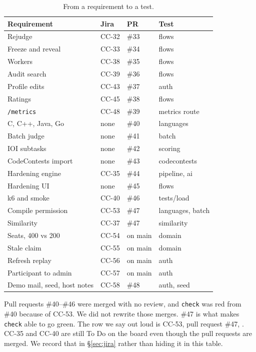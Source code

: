 \documentclass[11pt,a4paper]{article}
\begin{document}
\begin{table}[ht]
\centering
\caption{From a requirement to a test.}
\label{tab:trace}
{\small
\begin{tabularx}{\textwidth}{@{}Y l l Y@{}}
\toprule
Requirement & Jira & PR & Test \\
\midrule
Rejudge & CC-32 & \#33 & flows \\
Freeze and reveal & CC-33 & \#34 & flows \\
Workers & CC-38 & \#35 & flows \\
Audit search & CC-39 & \#36 & flows \\
Profile edits & CC-43 & \#37 & auth \\
Ratings & CC-45 & \#38 & flows \\
\texttt{/metrics} & CC-48 & \#39 & metrics route \\
C, C++, Java, Go & none & \#40 & languages \\
Batch judge & none & \#41 & batch \\
IOI subtasks & none & \#42 & scoring \\
CodeContests import & none & \#43 & codecontests \\
Hardening engine & CC-35 & \#44 & pipeline, ai \\
Hardening UI & none & \#45 & flows \\
k6 and smoke & CC-40 & \#46 & tests/load \\
Compile permission & CC-53 & \#47 & languages, batch \\
Similarity & CC-37 & \#47 & similarity \\
Seats, 400 vs 200 & CC-54 & on main & domain \\
Stale claim & CC-55 & on main & domain \\
Refresh replay & CC-56 & on main & auth \\
Participant to admin & CC-57 & on main & auth \\
Demo mail, seed, host notes & CC-58 & \#48 & auth, seed \\
\bottomrule
\end{tabularx}
}
\end{table}

Pull requests \#40--\#46 were merged with no review, and \texttt{check} was red from \#40 because of CC-53. We did not rewrite those merges. \#47 is what makes \texttt{check} able to go green. The row we say out loud is CC-53, pull request \#47, . CC-35 and CC-40 are still To Do on the board even though the pull requests are merged. We record that in \S\ref{sec:jira} rather than hiding it in this table.
\end{document}
